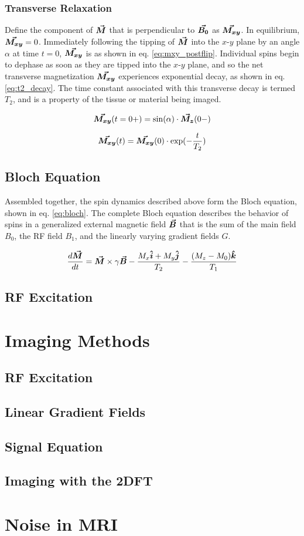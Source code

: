 \subsubsection{Transverse Relaxation}
Define the component of $\bm{\vec{M}}$ that is perpendicular to $\bm{\vec{B_0}}$ as $\bm{\vec{M_{xy}}}$. In equilibrium,
$\bm{\vec{M_{xy}}} = 0$.  Immediately following the tipping of $\bm{\vec{M}}$ into the $x$-$y$ plane by an angle $\alpha$ at
time $t=0$, $\bm{\vec{M_{xy}}}$ is as shown in eq. \ref{eq:mxy_postflip}. Individual spins begin to dephase as soon as they
are tipped into the $x$-$y$ plane, and so the net transverse magnetization $\bm{\vec{M_{xy}}}$ experiences exponential
decay, as shown in eq. \ref{eq:t2_decay}. The time constant associated with this transverse decay is termed $T_2$, and
is a property of the tissue or material being imaged.

\begin{equation}\label{eq:mxy_postflip}
    \bm{\vec{M_{xy}}}(t=0+) = \sin(\alpha) \cdot \bm{\vec{M_z}}(0-)
\end{equation}

\begin{equation}\label{eq:t2_decay}
    \bm{\vec{M_{xy}}}(t) = \bm{\vec{M_{xy}}}(0) \cdot \exp(-\frac{t}{T_2})
\end{equation}

\subsection{Bloch Equation}
Assembled together, the spin dynamics described above form the Bloch equation, shown in eq. \ref{eq:bloch}. The complete
Bloch equation describes the behavior of spins in a generalized external magnetic field $\bm{\vec{B}}$ that is the sum of
the main field $B_0$, the RF field $B_1$, and the linearly varying gradient fields $G$. 

\begin{equation}\label{eq:bloch}
    \frac{d \bm{\vec{M}}}{dt} = \bm{\vec{M}} \times \gamma \bm{\vec{B}} - \frac{M_x \bm{\hat{i}} + M_y \bm{\hat{j}}}{T_2} - \frac{(M_z - M_0)
    \bm{\hat{k}}}{T_1}
\end{equation}

\subsection{RF Excitation}

\section{Imaging Methods}
\subsection{RF Excitation}
\subsection{Linear Gradient Fields}
\subsection{Signal Equation}
\subsection{Imaging with the 2DFT}

\section{Noise in MRI}
